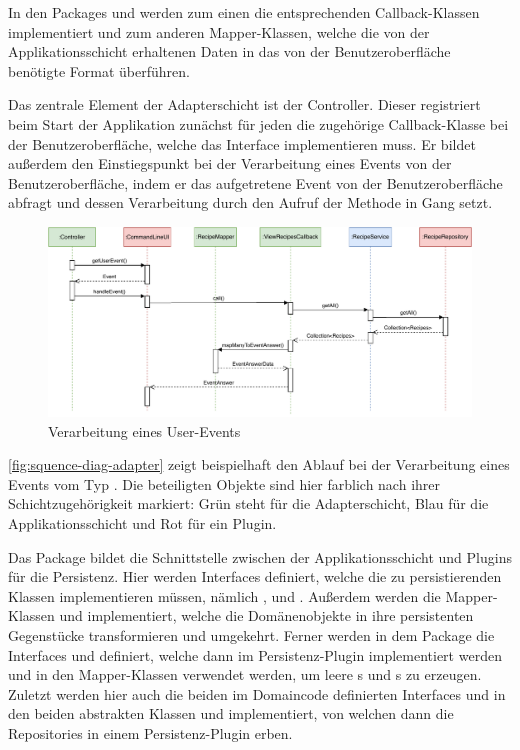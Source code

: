 In den Packages  und  werden zum einen die entsprechenden Callback-Klassen implementiert und zum anderen Mapper-Klassen, welche die von der Applikationsschicht erhaltenen Daten in das von der Benutzeroberfläche benötigte Format überführen.

Das zentrale Element der Adapterschicht ist der Controller. Dieser registriert beim Start der Applikation zunächst für jeden  die zugehörige Callback-Klasse bei der Benutzeroberfläche, welche das Interface  implementieren muss. Er bildet außerdem den Einstiegspunkt bei der Verarbeitung eines Events von der Benutzeroberfläche, indem er das aufgetretene Event von der Benutzeroberfläche abfragt und dessen Verarbeitung durch den Aufruf der Methode  in Gang setzt. 

\begin{figure}[ht!]
    \includegraphics[width=0.98\columnwidth]{../diagrams/adapter_sequence.pdf}
    \caption{Verarbeitung eines User-Events}
    \label{fig:squence-diag-adapter}
\end{figure}

\autoref{fig:squence-diag-adapter} zeigt beispielhaft den Ablauf bei der Verarbeitung eines Events vom Typ . Die beteiligten Objekte sind hier farblich nach ihrer Schichtzugehörigkeit markiert: Grün steht für die Adapterschicht, Blau für die Applikationsschicht und Rot für ein Plugin.

Das Package  bildet die Schnittstelle zwischen der Applikationsschicht und Plugins für die Persistenz. Hier werden Interfaces definiert, welche die zu persistierenden Klassen implementieren müssen, nämlich ,  und . Außerdem werden die Mapper-Klassen  und  implementiert, welche die Domänenobjekte in ihre persistenten Gegenstücke transformieren und umgekehrt. Ferner werden in dem Package die Interfaces  und  definiert, welche dann im Persistenz-Plugin implementiert werden und in den Mapper-Klassen verwendet werden, um leere s und s zu erzeugen. Zuletzt werden hier auch die beiden im Domaincode definierten Interfaces  und  in den beiden abstrakten Klassen  und  implementiert, von welchen dann die Repositories in einem Persistenz-Plugin erben.

